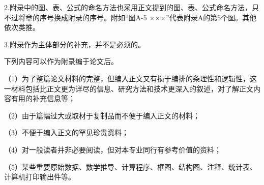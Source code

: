 \documentclass{QITthesis}
\begin{document}
2.附录中的图、表、公式的命名方法也采用正文提到的图、表、公式命名方法，只不过将章的序号换成附录的序号。附如“图A-5 ×××”代表附录A的第5个图。其他依次类推。

3.附录作为主体部分的补充，并不是必须的。

下列内容可以作为附录编于论文后。

（1）为了整篇论文材料的完整，但编入正文又有损于编排的条理性和逻辑性，这一材料包括比正文更为详尽的信息、研究方法和技术更深入的叙述，对了解正文内容有用的补充信息等；

（2）由于篇幅过大或取材于复制品而不便于编入正文的材料；

（3）不便于编入正文的罕见珍贵资料；

（4）对一般读者并非必要阅读，但对本专业同行有参考价值的资料；

（5）某些重要原始数据、数学推导、计算程序、框图、结构图、注释、统计表、计算机打印输出件等。
\end{document}
